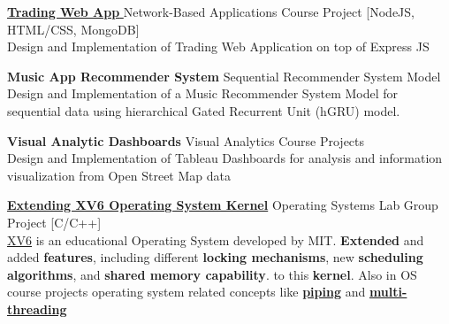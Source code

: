 \documentclass[letterpaper,11pt]{article}
\begin{document}
\item{
     \href{https://github.com/SharaaRe/network-based-development}{\textbf{Trading Web App} }{Network-Based Applications Course Project [NodeJS, HTML/CSS, MongoDB]}  \\ {Design and Implementation of Trading Web Application on top of Express JS}
    }
\item{
     {\textbf{Music App Recommender System} }{Sequential Recommender System Model }  \\ {Design and Implementation of a Music Recommender System Model for sequential data using hierarchical Gated Recurrent Unit (hGRU) model.}
    }
\item{
     {\textbf{Visual Analytic Dashboards} }{Visual Analytics Course Projects}  \\ {Design and Implementation of Tableau Dashboards for analysis and information visualization from Open Street Map data}
    }
    \item{
     \textbf{\href{https://github.com/SharaaRe/OSLabXV6}{Extending XV6 Operating System Kernel}}
    {Operating Systems Lab Group Project [C/C++]} \\
    {\href{https://gitlab.com/Sharaa_re/os-spring99-lab}{XV6} is an educational Operating System developed by MIT. \textbf{Extended} and added \textbf{features}, including different \textbf{locking mechanisms}, new \textbf{scheduling algorithms}, and \textbf{shared memory capability}. to this \textbf{kernel}. Also in OS course projects operating system related concepts like \textbf{\href{https://github.com/SharaaRe/OS-CourseAssignment-Pipe}{piping}} and\textbf{ \href{https://github.com/SharaaRe/OS-CourseAssignment3-Multithreading}{multi-threading}}}
    }
    


%

\end{document}
